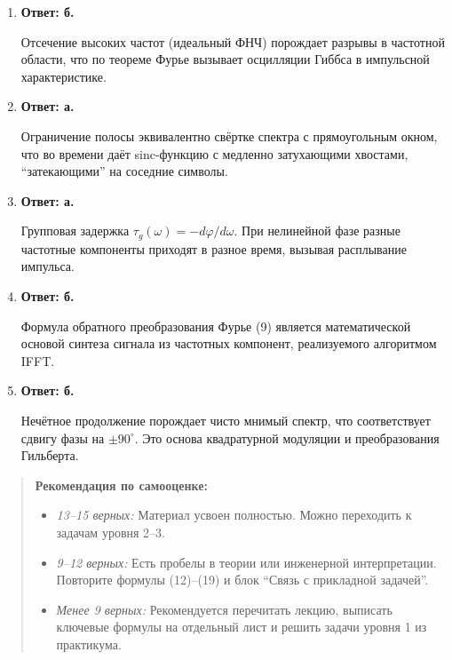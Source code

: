 \documentclass[12pt,a4paper]{article}
\begin{document}
\begin{enumerate}[label=\textbf{3.\arabic*.}]
    \item \textbf{Ответ: б.} \begin{applink}Отсечение высоких частот (идеальный ФНЧ) порождает разрывы в частотной области, что по теореме Фурье вызывает осцилляции Гиббса в импульсной характеристике.\end{applink}
    \item \textbf{Ответ: а.} \begin{applink}Ограничение полосы эквивалентно свёртке спектра с прямоугольным окном, что во времени даёт sinc-функцию с медленно затухающими хвостами, ``затекающими'' на соседние символы.\end{applink}
    \item \textbf{Ответ: а.} \begin{applink}Групповая задержка $\tau_g(\omega) = -d\varphi/d\omega$. При нелинейной фазе разные частотные компоненты приходят в разное время, вызывая расплывание импульса.\end{applink}
    \item \textbf{Ответ: б.} \begin{applink}Формула обратного преобразования Фурье (9) является математической основой синтеза сигнала из частотных компонент, реализуемого алгоритмом IFFT.\end{applink}
    \item \textbf{Ответ: б.} \begin{applink}Нечётное продолжение порождает чисто мнимый спектр, что соответствует сдвигу фазы на $\pm 90^\circ$. Это основа квадратурной модуляции и преобразования Гильберта.\end{applink}
\end{enumerate}

\begin{quote}
    \textbf{Рекомендация по самооценке:} 
    \begin{itemize}
        \item \textit{13--15 верных:} Материал усвоен полностью. Можно переходить к задачам уровня 2--3.
        \item \textit{9--12 верных:} Есть пробелы в теории или инженерной интерпретации. Повторите формулы (12)--(19) и блок ``Связь с прикладной задачей''.
        \item \textit{Менее 9 верных:} Рекомендуется перечитать лекцию, выписать ключевые формулы на отдельный лист и решить задачи уровня 1 из практикума.
    \end{itemize}
\end{quote}
\end{document}
